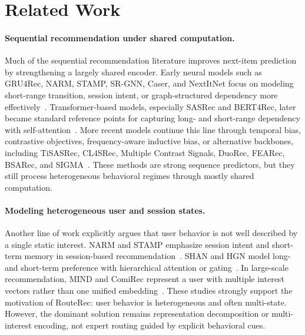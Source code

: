 \documentclass[sigconf,anonymous,review]{acmart}
\begin{document}
\section{Related Work}
\label{sec:related}

\paragraph{Sequential recommendation under shared computation.}
Much of the sequential recommendation literature improves next-item prediction by strengthening a largely shared encoder. Early neural models such as GRU4Rec, NARM, STAMP, SR-GNN, Caser, and NextItNet focus on modeling short-range transition, session intent, or graph-structured dependency more effectively~\cite{hidasi2016gru4rec,li2017narm,liu2018stamp,wu2019srgnn,tang2018caser,yuan2019nextitnet}. Transformer-based models, especially SASRec and BERT4Rec, later became standard reference points for capturing long- and short-range dependency with self-attention~\cite{kang2018sasrec,sun2019bert4rec}. More recent models continue this line through temporal bias, contrastive objectives, frequency-aware inductive bias, or alternative backbones, including TiSASRec, CL4SRec, Multiple Contrast Signals, DuoRec, FEARec, BSARec, and SIGMA~\cite{li2020tisasrec,xie2020cl4srec,wang2023multiplecontrast,qiu2022duorec,du2023fearec,shin2024bsarec,liu2025sigma}. These methods are strong sequence predictors, but they still process heterogeneous behavioral regimes through mostly shared computation.

\paragraph{Modeling heterogeneous user and session states.}
Another line of work explicitly argues that user behavior is not well described by a single static interest. NARM and STAMP emphasize session intent and short-term memory in session-based recommendation~\cite{li2017narm,liu2018stamp}. SHAN and HGN model long- and short-term preference with hierarchical attention or gating~\cite{ying2018shan,ma2019hgn}. In large-scale recommendation, MIND and ComiRec represent a user with multiple interest vectors rather than one unified embedding~\cite{li2019mind,cen2020comirec}. These studies strongly support the motivation of RouteRec: user behavior is heterogeneous and often multi-state. However, the dominant solution remains representation decomposition or multi-interest encoding, not expert routing guided by explicit behavioral cues.
\end{document}

